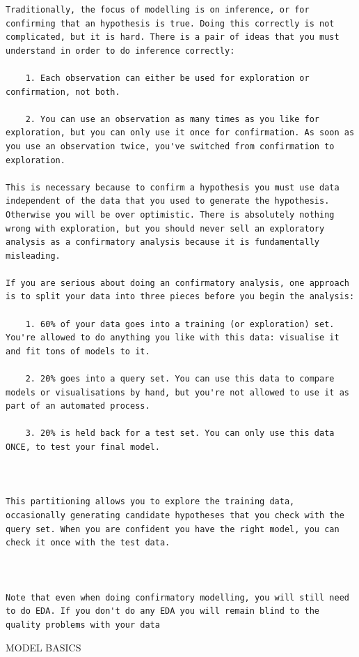 \documentclass[
]{book}
\begin{document}
\begin{verbatim}
Traditionally, the focus of modelling is on inference, or for confirming that an hypothesis is true. Doing this correctly is not complicated, but it is hard. There is a pair of ideas that you must understand in order to do inference correctly:

    1. Each observation can either be used for exploration or confirmation, not both.

    2. You can use an observation as many times as you like for exploration, but you can only use it once for confirmation. As soon as you use an observation twice, you've switched from confirmation to exploration.

This is necessary because to confirm a hypothesis you must use data independent of the data that you used to generate the hypothesis. Otherwise you will be over optimistic. There is absolutely nothing wrong with exploration, but you should never sell an exploratory analysis as a confirmatory analysis because it is fundamentally misleading.

If you are serious about doing an confirmatory analysis, one approach is to split your data into three pieces before you begin the analysis:

    1. 60% of your data goes into a training (or exploration) set. You're allowed to do anything you like with this data: visualise it and fit tons of models to it.

    2. 20% goes into a query set. You can use this data to compare models or visualisations by hand, but you're not allowed to use it as part of an automated process.

    3. 20% is held back for a test set. You can only use this data ONCE, to test your final model.



This partitioning allows you to explore the training data, occasionally generating candidate hypotheses that you check with the query set. When you are confident you have the right model, you can check it once with the test data.



Note that even when doing confirmatory modelling, you will still need to do EDA. If you don't do any EDA you will remain blind to the quality problems with your data
\end{verbatim}

MODEL BASICS
\end{document}

